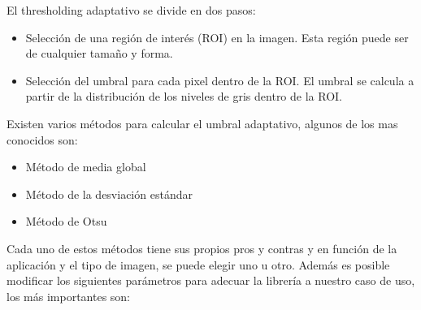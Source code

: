 El thresholding adaptativo se divide en dos pasos:
\begin{itemize}
\item Selección de una región de interés (ROI) en la imagen. Esta región puede ser de cualquier tamaño y forma.
\item Selección del umbral para cada pixel dentro de la ROI. El umbral se calcula a partir de la distribución de los niveles de gris dentro de la ROI.
\end{itemize}

Existen varios métodos para calcular el umbral adaptativo, algunos de los mas conocidos son:
\begin{itemize}
\item Método de media global
\item Método de la desviación estándar
\item Método de Otsu
\end{itemize}
Cada uno de estos métodos tiene sus propios pros y contras y en función de la aplicación y el tipo de imagen, se puede elegir uno u otro.
Además es posible modificar los siguientes parámetros para adecuar la librería a nuestro caso de uso, los más importantes son:
